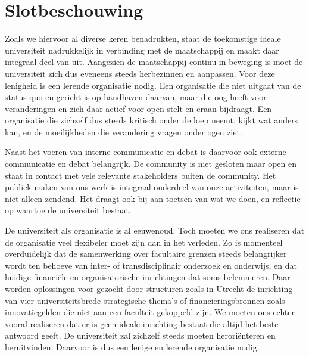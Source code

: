 \documentclass[smallauthor, chapterhaspagenum, nochapterinheader, pagenuminheader,  bigchapnum,medium2, tocpages, garamond, titleinheader]{jote-book}
\begin{document}
	\section{Slotbeschouwing}



	Zoals we hiervoor al diverse keren benadrukten, staat de toekomstige ideale universiteit nadrukkelijk in verbinding met de maatschappij en maakt daar integraal deel van uit. Aangezien de maatschappij continu in beweging is moet de universiteit zich dus eveneens steeds herbezinnen en aanpassen. Voor deze lenigheid is een lerende organisatie nodig. Een organisatie die niet uitgaat van de status quo en gericht is op handhaven daarvan, maar die oog heeft voor veranderingen en zich daar actief voor open stelt en eraan bijdraagt. Een organisatie die zichzelf dus steeds kritisch onder de loep neemt, kijkt wat anders kan, en de moeilijkheden die verandering vragen onder ogen ziet.



	Naast het voeren van interne communicatie en debat is daarvoor ook externe communicatie en debat belangrijk. De community is niet gesloten maar open en staat in contact met vele relevante stakeholders buiten de community. Het publiek maken van ons werk is integraal onderdeel van onze activiteiten, maar is niet alleen zendend. Het draagt ook bij aan toetsen van wat we doen, en reflectie op waartoe de universiteit bestaat.



	De universiteit als organisatie is al eeuwenoud. Toch moeten we ons realiseren dat de organisatie veel flexibeler moet zijn dan in het verleden. Zo is momenteel overduidelijk dat de samenwerking over facultaire grenzen steeds belangrijker wordt ten behoeve van inter- of transdisciplinair onderzoek en onderwijs, en dat huidige financiële en organisatorische inrichtingen dat soms belemmeren. Daar worden oplossingen voor gezocht door structuren zoals in Utrecht de inrichting van vier universiteitsbrede strategische thema's of financieringsbronnen zoals innovatiegelden die niet aan een faculteit gekoppeld zijn. We moeten ons echter vooral realiseren dat er is geen ideale inrichting bestaat die altijd het beste antwoord geeft. De universiteit zal zichzelf steeds moeten heroriënteren en heruitvinden. Daarvoor is dus een lenige en lerende organisatie nodig.
\end{document}
